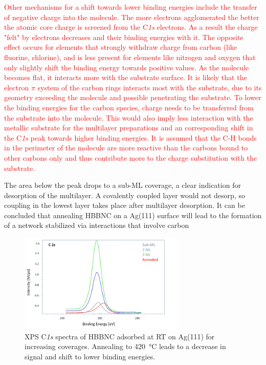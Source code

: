 \textcolor{red}{Other mechanisms for a shift towards lower binding energies include the transfer of negative charge into the molecule. The more electrons agglomerated the better the atomic core charge is screened from the C\textit{1s} electrons. As a result the charge "felt" by electrons decreases and their binding energies with it. 
	The opposite effect occurs for elements that strongly  withdraw charge from carbon (like fluorine, chlorine), and is less present for elements like nitrogen and oxygen that only slightly shift the binding energy towards positive values.
As the molecule becomes flat, it interacts more with the substrate surface. It is likely that the electron $\pi$ system of the carbon rings interacts most with the substrate, due to its geometry exceeding the molecule and possible penetrating the substrate. To lower the binding energies for the carbon species, charge needs to be transferred from the substrate into the molecule.
	This would also imply less interaction with the metallic substrate for the multilayer preparations and an corresponding shift in the C\textit{1s} peak towards higher binding energies. 
It is assumed that the C-H bonds in the perimeter of the molecule are more reactive than the carbons bound to other carbons only and thus contribute more to the charge substitution with the substrate. \cite{medeiros_benzene_2012}}

The area below the peak drops to a sub-ML coverage, a clear indication for desorption of the multilayer. A covalently coupled layer would not desorp, so coupling in the lowest layer takes place after multilayer desorption.
It can be concluded that annealing HBBNC on a Ag(111) surface will lead to the formation of a network stabilized via interactions that involve carbon 

\begin{figure}[] \centering
	\includegraphics[width=0.7\textwidth]{./images/hbbnc-xps1}
	\caption{XPS C\textit{1s} spectra of HBBNC adsorbed at RT on Ag(111) for increasing coverages. Annealing to \SI{420}{\celsius} leads to a decrease in signal and shift to lower binding energies.}
	\label{}
\end{figure}

